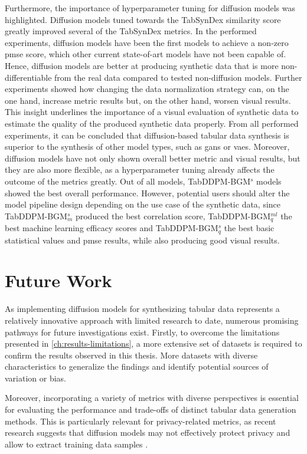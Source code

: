 Furthermore, the importance of hyperparameter tuning for diffusion models was highlighted.
Diffusion models tuned towards the TabSynDex similarity score greatly improved several of the TabSynDex metrics.
In the performed experiments, diffusion models have been the first models to achieve a non-zero \gls{pmse} score, which other current state-of-art models have not been capable of.
Hence, diffusion models are better at producing synthetic data that is more non-differentiable from the real data \cite{chundawat2022UniversalMetricRobust} compared to tested non-diffusion models.
Further experiments showed how changing the data normalization strategy can, on the one hand, increase metric results but, on the other hand, worsen visual results.
This insight underlines the importance of a visual evaluation of synthetic data to estimate the quality of the produced synthetic data properly.
From all performed experiments, it can be concluded that diffusion-based tabular data synthesis is superior to the synthesis of other model types, such as \glspl{gan} or \glspl{vae}.
Moreover, diffusion models have not only shown overall better metric and visual results, but they are also more flexible, as a hyperparameter tuning already affects the outcome of the metrics greatly.
Out of all models, TabDDPM-BGM$^{s}$ models showed the best overall performance.
However, potential users should alter the model pipeline design depending on the use case of the synthetic data, since TabDDPM-BGM$^{s}_m$ produced the best correlation score, TabDDPM-BGM$^{ml}_q$ the best machine learning efficacy scores and TabDDPM-BGM$^{s}_q$ the best basic statistical values and \gls{pmse} results, while also producing good visual results.


\section{Future Work}
\label{ch:results-futureWork}

As implementing diffusion models for synthesizing tabular data represents a relatively innovative approach with limited research to date, numerous promising pathways for future investigations exist.
Firstly, to overcome the limitations presented in \autoref{ch:results-limitations}, a more extensive set of datasets is required to confirm the results observed in this thesis.
More datasets with diverse characteristics to generalize the findings and identify potential sources of variation or bias.

Moreover, incorporating a variety of metrics with diverse perspectives is essential for evaluating the performance and trade-offs of distinct tabular data generation methods.
This is particularly relevant for privacy-related metrics, as recent research suggests that diffusion models may not effectively protect privacy and allow to extract training data samples \cite{carlini2023ExtractingTrainingData}.

